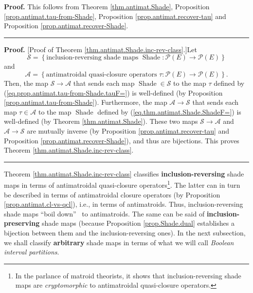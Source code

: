 \documentclass[numbers=enddot,12pt,final,onecolumn]{scrartcl}%
\theoremstyle{definition}
\newenvironment{proof}[1][Proof]{\noindent\textbf{#1.} }{\ \rule{0.5em}{0.5em}}
\newenvironment{verlong}{}{}
\newenvironment{vershort}{}{}
\begin{document}
\begin{vershort}


\begin{proof}
This follows from Theorem \ref{thm.antimat.Shade}, Proposition
\ref{prop.antimat.tau-from-Shade}, Proposition \ref{prop.antimat.recover-tau}
and Proposition \ref{prop.antimat.recover-Shade}.
\end{proof}
\end{vershort}

\begin{verlong}


\begin{proof}
[Proof of Theorem \ref{thm.antimat.Shade.inc-rev-class}.]Let%
\[
\mathcal{S}=\left\{  \text{inclusion-reversing shade maps }%
\operatorname*{Shade}:\mathcal{P}\left(  E\right)  \rightarrow\mathcal{P}%
\left(  E\right)  \right\}
\]
and%
\[
\mathcal{A}=\left\{  \text{antimatroidal quasi-closure operators }%
\tau:\mathcal{P}\left(  E\right)  \rightarrow\mathcal{P}\left(  E\right)
\right\}  .
\]
Then, the map $\mathcal{S}\rightarrow\mathcal{A}$ that sends each map
$\operatorname*{Shade}\in\mathcal{S}$ to the map $\tau$ defined by
(\ref{eq.prop.antimat.tau-from-Shade.tauF=}) is well-defined (by Proposition
\ref{prop.antimat.tau-from-Shade}). Furthermore, the map $\mathcal{A}%
\rightarrow\mathcal{S}$ that sends each map $\tau\in\mathcal{A}$ to the map
$\operatorname*{Shade}$ defined by (\ref{eq.thm.antimat.Shade.ShadeF=}) is
well-defined (by Theorem \ref{thm.antimat.Shade}). These two maps
$\mathcal{S}\rightarrow\mathcal{A}$ and $\mathcal{A}\rightarrow\mathcal{S}$
are mutually inverse (by Proposition \ref{prop.antimat.recover-tau} and
Proposition \ref{prop.antimat.recover-Shade}), and thus are bijections. This
proves Theorem \ref{thm.antimat.Shade.inc-rev-class}.
\end{proof}
\end{verlong}

Theorem \ref{thm.antimat.Shade.inc-rev-class} classifies
\textbf{inclusion-reversing} shade maps in terms of antimatroidal
quasi-closure operators\footnote{In the parlance of matroid theorists, it
shows that inclusion-reversing shade maps are \emph{cryptomorphic} to
antimatroidal quasi-closure operators.}. The latter can in turn be described
in terms of antimatroidal closure operators (by Proposition
\ref{prop.antimat.cl-vs-qcl}), i.e., in terms of antimatroids. Thus,
inclusion-reversing shade maps \textquotedblleft boil down\textquotedblright%
\ to antimatroids. The same can be said of \textbf{inclusion-preserving} shade
maps (because Proposition \ref{prop.Shade.dual} establishes a bijection
between them and the inclusion-reversing ones). In the next subsection, we
shall classify \textbf{arbitrary} shade maps in terms of what we will call
\emph{Boolean interval partitions}.
\end{document}
